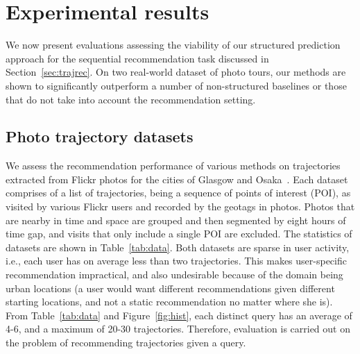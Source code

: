 
\secmoveup
\section{Experimental results}
\label{sec:experiment}
\textmoveup

We now present evaluations assessing the viability of our structured prediction approach
for the sequential recommendation task discussed in Section~\ref{sec:trajrec}.
On two real-world dataset of photo tours, our methods are shown to significantly outperform
a number of non-structured baselines or those that do not take into account the recommendation setting.


\secmoveup
\subsection{Photo trajectory datasets}
\label{sec:dataset}
\textmoveup

We assess the recommendation performance %
of various methods
on trajectories extracted from Flickr photos
for the cities of Glasgow and Osaka~\cite{thomee2016yfcc100m,ijcai15}.
Each dataset comprises of a
list of trajectories, being a sequence of points of interest (POI), as visited by various Flickr users
and recorded by the geotags in photos. Photos that are nearby in time and space are grouped and then segmented by eight hours of time gap, and visits that only include a single POI are excluded.
The statistics of datasets are shown in Table~\ref{tab:data}.
Both datasets are sparse in user activity,
i.e., each user has on average less than two trajectories.
This makes user-specific recommendation impractical, and also undesirable because of the domain being urban locations
(a user would want different recommendations given different starting locations, and not a static recommendation no matter where she is).
From Table~\ref{tab:data} and Figure~\ref{fig:hist},
each distinct query %
has an average of 4-6, and a maximum of 20-30 trajectories.
Therefore, evaluation is carried out on the problem of recommending trajectories given a query.

